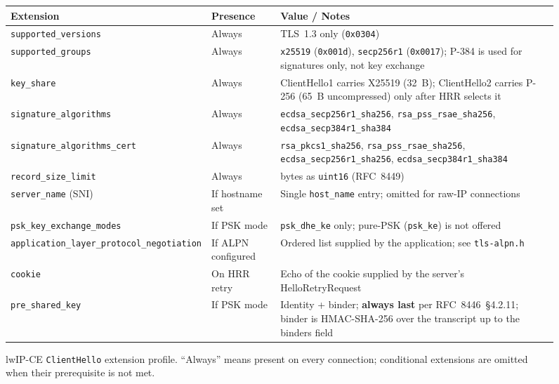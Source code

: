 \documentclass[titlepage]{report}
\begin{document}
	\begin{figure}[H]
		\centering
		\footnotesize
		\begin{tabularx}{0.94\textwidth}{@{}>{\raggedright\arraybackslash}p{}>{\raggedright\arraybackslash}p{}>{\raggedright\arraybackslash}X@{}}
			\toprule
			\rowcolor{gray!18}
			Extension & Presence & Value / Notes \\
			\midrule
			\texttt{supported\_versions} & Always & TLS~1.3 only (\texttt{0x0304}) \\
			\texttt{supported\_groups} & Always & \texttt{x25519} (\texttt{0x001d}), \texttt{secp256r1} (\texttt{0x0017}); P-384 is used for signatures only, not key exchange \\
			\texttt{key\_share} & Always & ClientHello1 carries X25519 (32~B); ClientHello2 carries P-256 (65~B uncompressed) only after HRR selects it \\
			\texttt{signature\_algorithms} & Always & \texttt{ecdsa\_secp256r1\_sha256}, \texttt{rsa\_pss\_rsae\_sha256}, \texttt{ecdsa\_secp384r1\_sha384} \\
			\texttt{signature\_algorithms\_cert} & Always & \texttt{rsa\_pkcs1\_sha256}, \texttt{rsa\_pss\_rsae\_sha256}, \texttt{ecdsa\_secp256r1\_sha256}, \texttt{ecdsa\_secp384r1\_sha384} \\
			\texttt{record\_size\_limit} & Always & 4096 bytes as \texttt{uint16} (RFC~8449) \\
			\texttt{server\_name} (SNI) & If hostname set & Single \texttt{host\_name} entry; omitted for raw-IP connections \\
			\texttt{psk\_key\_exchange\_modes} & If PSK mode & \texttt{psk\_dhe\_ke} only; pure-PSK (\texttt{psk\_ke}) is not offered \\
			\texttt{application\_layer\_protocol\_negotiation} & If ALPN configured & Ordered list supplied by the application; see \texttt{tls-alpn.h} \\
			\texttt{cookie} & On HRR retry & Echo of the cookie supplied by the server's HelloRetryRequest \\
			\texttt{pre\_shared\_key} & If PSK mode & Identity + binder; \textbf{always last} per RFC~8446~\S4.2.11; binder is HMAC-SHA-256 over the transcript up to the binders field \\
			\bottomrule
		\end{tabularx}
		\caption{\footnotesize lwIP-CE \texttt{ClientHello} extension profile. ``Always'' means present on every connection; conditional extensions are omitted when their prerequisite is not met.}
	\end{figure}
\end{document}
